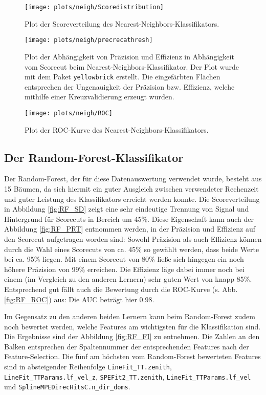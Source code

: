 \begin{figure}
	\centering
	\texttt{[image: plots/neigh/Scoredistribution]}
	\caption{Plot der Scoreverteilung des Nearest-Neighbors-Klassifikators.}
	\label{fig:NN_SD}
\end{figure}

\begin{figure}
	\centering
	\texttt{[image: plots/neigh/precrecathresh]}
	\caption{Plot der Abhängigkeit von Präzision und Effizienz in Abhängigkeit vom Scorecut beim Nearest-Neighbors-Klassifikator. Der Plot wurde mit dem Paket \texttt{yellowbrick} \cite{yellowbrick} erstellt. Die eingefärbten Flächen entsprechen der Ungenauigkeit der Präzision bzw. Effizienz, welche mithilfe einer Kreuzvalidierung erzeugt wurden.}
	\label{fig:NN_PRT}
\end{figure}


\begin{figure}
	\centering
	\texttt{[image: plots/neigh/ROC]}
	\caption{Plot der ROC-Kurve des Nearest-Neighbors-Klassifikators.}
	\label{fig:NN_ROC}
\end{figure}



\subsection{Der Random-Forest-Klassifikator}

Der Random-Forest, der für diese Datenauswertung verwendet wurde, besteht aus 15 Bäumen, da sich hiermit ein guter Ausgleich zwischen verwendeter Rechenzeit und guter Leistung des Klassifikators erreicht werden konnte. Die Scoreverteilung in Abbildung \ref{fig:RF_SD} zeigt eine sehr eindeutige Trennung von Signal und Hintergrund für Scorecuts in Bereich um 45\%. Diese Eigenschaft kann auch der Abbildung \ref{fig:RF_PRT} entnommen werden, in der Präzision und Effizienz auf den Scorecut aufgetragen worden sind: Sowohl Präzision als auch Effizienz können durch die Wahl eines Scorecuts von ca. 45\% so gewählt werden, dass beide Werte bei ca. 95\% liegen. Mit einem Scorecut von 80\% ließe sich hingegen ein noch höhere Präzision von 99\% erreichen. Die Effizienz läge dabei immer noch bei einem (im Vergleich zu den anderen Lernern) sehr guten Wert von knapp 85\%. Entsprechend gut fällt auch die Bewertung durch die ROC-Kurve (s. Abb. \ref{fig:RF_ROC}) aus: Die AUC beträgt hier 0.98.

Im Gegensatz zu den anderen beiden Lernern kann beim Random-Forest zudem noch bewertet werden, welche Features am wichtigsten für die Klassifikation sind. Die Ergebnisse sind der Abbildung \ref{fig:RF_FI} zu entnehmen. Die Zahlen an den Balken entsprechen der Spaltennummer der entsprechenden Features nach der Feature-Selection. Die fünf am höchsten vom Random-Forest bewerteten Features sind in absteigender Reihenfolge \texttt{LineFit\_TT.zenith}, \texttt{LineFit\_TTParams.lf\_vel\_z}, \texttt{SPEFit2\_TT.zenith}, \texttt{Line\-Fit\_TT\-Params.lf\_vel} und \texttt{SplineMPEDirecHitsC.n\_dir\_doms}. 

